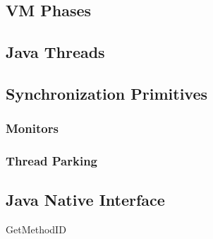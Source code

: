 




\subsection{VM Phases}


\subsection{Java Threads}



\subsection{Synchronization Primitives}



\subsubsection{Monitors}

\subsubsection{Thread Parking}

\subsection{Java Native Interface}


GetMethodID

